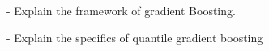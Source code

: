 - Explain the framework of gradient Boosting.

- Explain the specifics of quantile gradient boosting